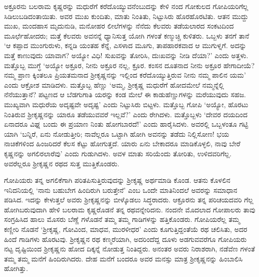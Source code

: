 ಅಕ್ರೂರನು ಬಲರಾಮ ಕೃಷ್ಣರನ್ನು ಮಧುರೆಗೆ ಕರೆದೊಯ್ಯುವನೆಂಬುದನ್ನು ಕೇಳಿ ನಂದ ಗೋಕುಲದ ಗೋಪಿಯರಿಗೆಲ್ಲ ಸಿಡಿಲುಬಡಿದಂತಾಯಿತು. ಅವರ ಮುಖ ಕುಂದಿತು, ಮಾತು ನಿಂತಿತು, ನಿಟ್ಟುಸಿರು ಹೊರಹೊರಟಿತು. ಆತನ ಮುದ್ದು ಮುಖ, ಮಂದಹಾಸ ಮೃದುನುಡಿ, ಮನೋಹರ ಲೀಲೆಗಳನ್ನು ನೆನೆದು ಕೆಲವರು ತಡೆಯಲಾರದ ಸಂಕಟದಿಂದ ಮೂರ್ಛೆಹೋದರು; ಮತ್ತೆ ಕೆಲವರು ಅವನನ್ನೆ ಧ್ಯಾನಿಸುತ್ತ ಯೋಗಿ ಗಳಂತೆ ಕಣ್ಮುಚ್ಚಿ ಕುಳಿತರು. ಒಬ್ಬಳು ತನಗೆ ತಾನೆ ‘ಆ ಕಪ್ಪಾದ ಮುಂಗುರುಳು, ಕನ್ನಡಿ ಯಂತಹ ಕೆನ್ನೆ, ಎಸಳಾದ ಮೂಗು, ತಾಪಹಾರಕವಾದ ಆ ಮುಗುಳ್ನಗೆ. ಅದನ್ನು ಮತ್ತೆ ಕಾಣುವುದು ಯಾವಾಗ? ಅಯ್ಯೋ ವಿಧಿ! ಸುಖವನ್ನು ತೋರಿಸಿ, ದುಃಖವನ್ನು ನೀಡಿ ದೆಯಾ?’ ಎಂದು ಅತ್ತಳು. ಮತ್ತೊಬ್ಬ ಮುಗ್ಧೆ ‘ಅಯ್ಯೋ ಅಕ್ರೂರ, ನೀನು ಅಕ್ರೂರ ನಲ್ಲ, ಕ್ರೂರ. ಕಂಸನ ದೂತನಾದ ನೀನು ಅಕ್ರೂರ ಹೇಗಾದೀಯೆ? ನಮ್ಮ ಪ್ರಾಣ ಕ್ಕಿಂತಲೂ ಪ್ರಿಯತಮನಾದ ಶ್ರೀಕೃಷ್ಣನನ್ನು ಇಲ್ಲಿಂದ ಕರೆದೊಯ್ಯುತ್ತಿರುವ ನೀನು ನಮ್ಮ ಪಾಲಿನ ಯಮ’ ಎಂದು ಆಕ್ರೋಶ ಮಾಡಿದಳು. ಮತ್ತೊಬ್ಬ ಹೆಣ್ಣು ‘ಅಮ್ಮ, ಶ್ರೀಕೃಷ್ಣ ಮಧುರೆಗೆ ಹೋದಮೇಲೆ ನಮ್ಮನ್ನೆಲ್ಲಿ ನೆನೆಯುತ್ತಾನೆ? ಪಟ್ಟಣದ ಆ ಬೆಡಗುಗಾತಿ ಯರನ್ನು ಕಂಡ ಮೇಲೆ ಈ ಕಾಡುಹೆಣ್ಣುಗಳನ್ನು ಮರೆಯುವುದು ಸಹಜ. ಮುಖ್ಯವಾಗಿ ಮಧುರೆಯ ಅದೃಷ್ಟವೇ ಅದೃಷ್ಟ’ ಎಂದು ನಿಟ್ಟುಸಿರು ಬಿಟ್ಟಳು. ಮತ್ತೊಬ್ಬ ಗೋಪಿ ‘ಅಯ್ಯೋ, ಹೊರಟು ನಿಂತಿರುವ ಶ್ರೀಕೃಷ್ಣನನ್ನು ಯಾರೂ ತಡೆಯುವವರೆ ಇಲ್ಲವೆ?’ ಎಂದು ರೇಗಿದಳು. ಮತ್ತೊಬ್ಬಳು ‘ದೇವರ ದಯದಿಂದ ಏನಾದರೂ ವಿಘ್ನ ಬಂದು ಈ ಪ್ರಯಾಣ ನಿಂತು ಹೋಗಬಾರದೆ!’ ಎಂದು ಹಾರೈಸಿದಳು. ಅವರಲ್ಲಿ ಒಬ್ಬಳಂತೂ ಗಟ್ಟಿ ಯಾಗಿ ‘ಬನ್ನಿರೆ, ಏನು ನೋಡುತ್ತೀರಿ; ನಾವೆಲ್ಲರೂ ಒಟ್ಟಾಗಿ ಹೋಗಿ ಅವನನ್ನು ತಡೆದು ನಿಲ್ಲಿಸೋಣ! ಭಯ ನಾಚಿಕೆಗಳಿಂದ ಹಿಂಜರಿದರೆ ಕೆಲಸ ಕೆಟ್ಟು ಹೋಗುತ್ತದೆ. ಯಾರು ಏನು ಬೇಕಾದರೂ ಮಾಡಿಕೊಳ್ಳಲಿ, ನಾವು ಬೇರೆ ಕೃಷ್ಣನನ್ನು ಅಗಲಿರಲಾರೆವು’ ಎಂದು ಗುಡುಗಿದಳು. ಅವಳ ಮಾತು ಸರಿಯೆಂದು ತೋರಿತು, ಉಳಿದವರಿಗೆಲ್ಲ. ಅವರೆಲ್ಲರೂ ಶ್ರೀಕೃಷ್ಣನ ರಥದ ಸುತ್ತ ಮುತ್ತಿಕೊಂಡರು.

ಗೋಪಿಯರು ತನ್ನ ಅಗಲಿಕೆಗಾಗಿ ಪರಿತಪಿಸುತ್ತಿರುವುದನ್ನು ಶ್ರೀಕೃಷ್ಣ ಅರ್ಥಮಾಡಿ ಕೊಂಡ. ಆತನು ಕೊಳಲಿನ ಇನಿದನಿಯಲ್ಲಿ ‘ನಾನು ಬಹುಬೇಗ ಹಿಂದಿರುಗಿ ಬರುತ್ತೇನೆ’ ಎಂಬ ಒಂದೇ ಮಾತಿನಿಂದಲೆ ಅವರನ್ನು ಸಮಾಧಾನ ಪಡಿಸಿದ. ಇದನ್ನು ಕೇಳುತ್ತಲೆ ಅವರು ಶ್ರೀಕೃಷ್ಣನನ್ನು ಬೀಳ್ಕೊಡಲು ಸಿದ್ಧರಾದರು. ಆಕ್ರೂರನು ತನ್ನ ಪರಿಚಯದವರಿ ಗೆಲ್ಲ ಹೋಗಿಬರುವುದಾಗಿ ಹೇಳಿ ಬಲರಾಮ ಕೃಷ್ಣರೊಡನೆ ತನ್ನ ರಥವನ್ನೇರಿದನು. ನಂದನೇ ಮೊದಲಾದ ಗೋಪಾಲರು ತಾವು ಸಂಗ್ರಹಿಸಿದ ಹಾಲು ಮೊಸರು ಬೆಣ್ಣೆ ಗಳೊಡನೆ ತಮ್ಮ ತಮ್ಮ ಗಾಡಿಗಳನ್ನು ಹತ್ತಿಕೊಂಡರು. ಗೋಪಿಯರೆಲ್ಲ ತಮ್ಮ ಕಣ್ಣೀರಿ ನೊಡನೆ ‘ಶ್ರೀಕೃಷ್ಣ, ಗೋವಿಂದ, ಮಾಧವ, ಮುರಳೀಧರ’ ಎಂದು ಕೂಗುತ್ತಿದ್ದಂತೆಯೆ ರಥ ಚಲಿಸಿತು, ಅದರ ಹಿಂದೆ ಗಾಡಿಗಳು ಹೊರಟವು. ಶ್ರೀಕೃಷ್ಣನ ರಥ ಕಣ್ಮರೆಯಾಗಿ, ಅದರಿಂದೆದ್ದ ದೂಳು ಅಡಗುವವರೆಗೂ ಗೋಪಿಯರು ನಟ್ಟ ದೃಷ್ಟಿಯಿಂದ ಶ್ರೀಕೃಷ್ಣನು ಹೋದ ದಿಕ್ಕನ್ನೆ ನೋಡುತ್ತ ನಿಂತಿದ್ದರು. ಅನಂತರ ಅವರು ನಿರಾಶರಾಗಿ, ನಡೆವೆಣ ಗಳಂತೆ ತಮ್ಮ ತಮ್ಮ ಮನೆಗೆ ಹಿಂದಿರುಗಿದರು. ದೇಹ ಮನೆಗೆ ಬಂದರೂ ಅವರ ಮನಸ್ಸು ಮಾತ್ರ ಶ್ರೀಕೃಷ್ಣನನ್ನು ಹಿಂಬಾಲಿಸಿ ಹೋಗಿತ್ತು.

